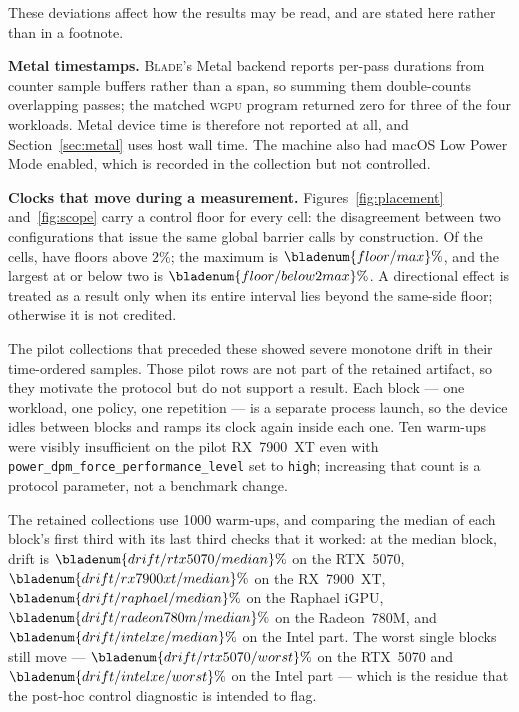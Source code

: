\documentclass[10pt,twocolumn]{article}
\newcommand{\blade}{\textsc{Blade}}
\newcommand{\wgpu}{\textsc{wgpu}}
\begin{document}
These deviations affect how the results may be read, and are stated here
rather than in a footnote.

\textbf{Metal timestamps.} \blade's Metal backend reports per-pass durations
from counter sample buffers rather than a span, so summing them double-counts
overlapping passes; the matched \wgpu{} program returned zero for three of the
four workloads. Metal device time is therefore not reported at all, and
Section~\ref{sec:metal} uses host wall time. The machine also had macOS Low
Power Mode enabled, which is recorded in the collection but not controlled.

\textbf{Clocks that move during a measurement.} Figures~\ref{fig:placement} and~\ref{fig:scope} carry a
control floor for every cell: the disagreement between two configurations that
issue the same global barrier calls by construction. Of the  cells,
 have floors above $2\%$; the maximum is
$\bladenum{floor/max}\%$, and the largest at or below two is
$\bladenum{floor/below2max}\%$. A directional effect is treated as a result
only when its entire interval lies beyond the same-side floor; otherwise it is
not credited.

The pilot collections that preceded these showed severe monotone drift in
their time-ordered samples. Those pilot rows are not part of the retained
artifact, so they motivate the protocol but do not support a result. Each
block --- one workload, one policy, one repetition --- is a separate process
launch, so the device idles between blocks and ramps its clock again inside
each one. Ten warm-ups were visibly insufficient on the pilot RX~7900~XT even
with \texttt{power\_dpm\_force\_performance\_level} set to \texttt{high};
increasing that count is a protocol parameter, not a benchmark change.

The retained collections use 1000 warm-ups, and comparing the median of each
block's first third with its last third checks that it worked: at the median
block, drift is $\bladenum{drift/rtx5070/median}\%$ on the RTX~5070,
$\bladenum{drift/rx7900xt/median}\%$ on the RX~7900~XT,
$\bladenum{drift/raphael/median}\%$ on the Raphael iGPU,
$\bladenum{drift/radeon780m/median}\%$ on the Radeon~780M, and
$\bladenum{drift/intelxe/median}\%$ on the Intel part. The worst single blocks
still move --- $\bladenum{drift/rtx5070/worst}\%$ on the RTX~5070 and
$\bladenum{drift/intelxe/worst}\%$ on the Intel part --- which is the residue
that the post-hoc control diagnostic is intended to flag.
\end{document}
